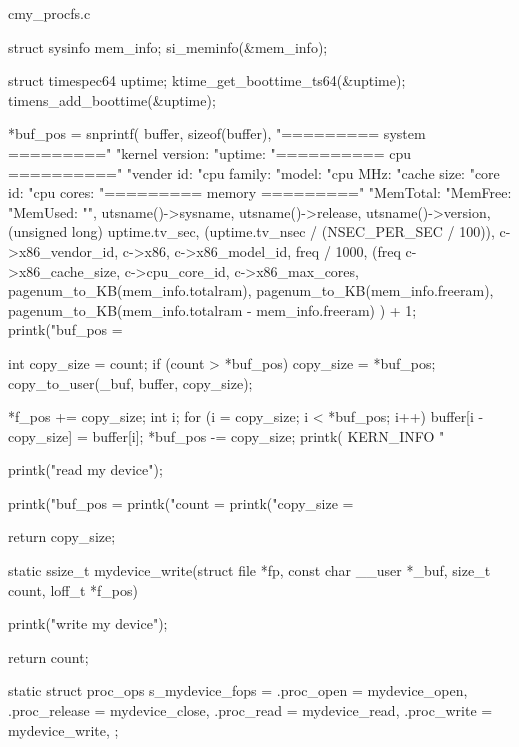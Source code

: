 \begin{longlisting}
\begin{myminted}{c}{my_procfs.c}
{{        struct sysinfo mem_info;
        si_meminfo(&mem_info);

        struct timespec64 uptime;
        ktime_get_boottime_ts64(&uptime);
        timens_add_boottime(&uptime);

        *buf_pos = snprintf(
            buffer, 
            sizeof(buffer), 
            "========= system =========\n"
            "kernel version: %
            "uptime: %
            "========== cpu ==========\n"
            "vender id: %
            "cpu family: %
            "model: %
            "cpu MHz: %
            "cache size: %
            "core id: %
            "cpu cores: %
            "========= memory =========\n"
            "MemTotal: %
            "MemFree: %
            "MemUsed: %
            "",
            utsname()->sysname,
            utsname()->release,
            utsname()->version,
            (unsigned long) uptime.tv_sec,
            (uptime.tv_nsec / (NSEC_PER_SEC / 100)),
            c->x86_vendor_id,
            c->x86,
            c->x86_model_id,
            freq / 1000, (freq %
            c->x86_cache_size,
            c->cpu_core_id,
            c->x86_max_cores,
            pagenum_to_KB(mem_info.totalram),
            pagenum_to_KB(mem_info.freeram),
            pagenum_to_KB(mem_info.totalram - mem_info.freeram)
        ) + 1;
        printk("buf_pos = %
    }

    int copy_size = count;
    if (count > *buf_pos) copy_size = *buf_pos;
    copy_to_user(_buf, buffer, copy_size);

    *f_pos += copy_size;
    int i;
    for (i = copy_size; i < *buf_pos; i++) {
        buffer[i - copy_size] = buffer[i];
    }
    *buf_pos -= copy_size;
    printk( KERN_INFO "%

    printk("read my device\n");

    printk("buf_pos = %
    printk("count = %
    printk("copy_size = %

    return copy_size;
}

static ssize_t mydevice_write(struct file *fp, const char __user *_buf, size_t count, loff_t *f_pos) {
    printk("write my device\n");

    return count;
}

static struct proc_ops s_mydevice_fops = {
    .proc_open    = mydevice_open,
    .proc_release = mydevice_close,
    .proc_read    = mydevice_read,
    .proc_write   = mydevice_write,
};


\end{myminted}
\end{longlisting}
